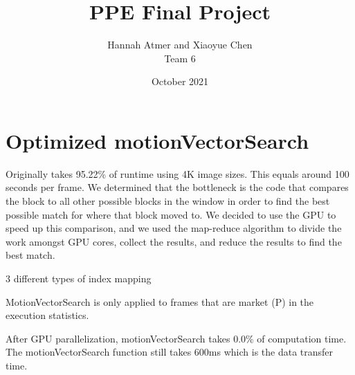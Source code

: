 \documentclass{article}
\title{PPE Final Project}
\author{Hannah Atmer and Xiaoyue Chen \\ Team 6}
\date{October 2021}
\begin{document}
\maketitle


\section{Optimized motionVectorSearch}

Originally takes 95.22\% of runtime using 4K image sizes. This equals around 100 seconds per frame.
We determined that the bottleneck is the code that compares the block to all other possible blocks in the window in order to find the best possible match for where that block moved to.
We decided to use the GPU to speed up this comparison, and we used the map-reduce algorithm to divide the work amongst GPU cores, collect the results, and reduce the results to find the best match.

3 different types of index mapping


MotionVectorSearch is only applied to frames that are market (P) in the execution statistics. 

After GPU parallelization, motionVectorSearch takes 0.0\% of computation time. The motionVectorSearch function still takes 600ms which is the data transfer time.

\end{document}

